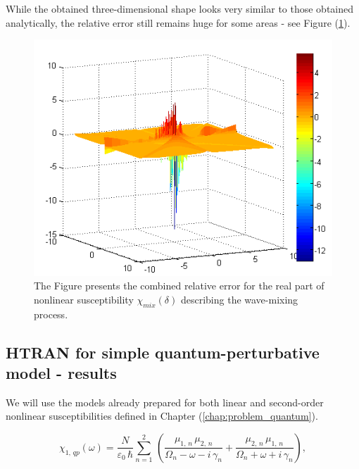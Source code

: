 \documentclass[12pt,twoside,a4paper]{article}
\numberwithin{equation}{subsection}
\numberwithin{figure}{subsection}
\begin{document}
While the obtained three-dimensional shape looks very similar to those obtained analytically, the relative error still remains huge for some areas - see Figure (\ref{fig:htran_fmix_3derr}).

\begin{figure}
  \begin{center}
    \includegraphics{img/htran_fmix_3derr.png}
    \caption{The Figure presents the combined relative error for the real part of nonlinear susceptibility ${\chi_{mix}}(\delta )$ describing the wave-mixing process. \label{fig:htran_fmix_3derr}}
  \end{center}    
\end{figure}

\subsection{HTRAN for simple quantum-perturbative model - results} \label{chap:htran_quantum}

We will use the models already prepared for both linear and second-order nonlinear susceptibilities defined in Chapter (\ref{chap:problem_quantum}).

\begin{equation} \label{eq:htran_qpeq}
  \chi_{1, \,qp}(\omega ) = 
  \frac{N}{\varepsilon_0\,\hbar} \sum_{n=1}^{2}\,(\frac {{\mu_{1, \,n}}\,{\mu_{2, \,n}}}{{\Omega_{n}} - \omega -
  i\,{\gamma_{n}}} + \frac {{\mu_{2, \,n}}\,{\mu_{1, \,n}}}{{\Omega_{n}} + \omega + i\,{\gamma_{n}}}) ,
\end{equation}
\end{document}
